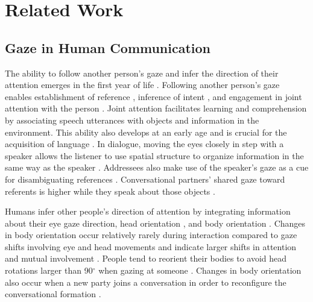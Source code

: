 


\pagestyle{deposit}

\chapter{Related Work}

\section{Gaze in Human Communication}
\label{sec:BackgroundHumanGaze}

The ability to follow another person's gaze and infer the direction of their attention emerges in the first year of life \citep{scaife1975infant}. Following another person's gaze enables establishment of reference \citep{dentremont2007early}, inference of intent \citep{mumme2007actions}, and engagement in joint attention with the person \citep{dentremont2007early}. Joint attention facilitates learning and comprehension by associating speech utterances with objects and information in the environment. This ability also develops at an early age and is crucial for the acquisition of language \citep{woodward2005infants}. In dialogue, moving the eyes closely in step with a speaker allows the listener to use spatial structure to organize information in the same way as the speaker \citep{richardson2005looking}. Addressees also make use of the speaker's gaze as a cue for disambiguating references \citep{hanna2007speakers,preissler2005role}. Conversational partners' shared gaze toward referents is higher while they speak about those objects \citep{bard1988referring}.

Humans infer other people's direction of attention by integrating information about their eye gaze direction, head orientation \citep{hietanen1999does}, and body orientation \citep{langton2000eyes,hietanen2002social,pomianowska2011socialcues}. Changes in body orientation occur relatively rarely during interaction compared to gaze shifts involving eye and head movements and indicate larger shifts in attention and mutual involvement \citep{kendon1973visible,schegloff1998bodytorque}. People tend to reorient their bodies to avoid head rotations larger than 90$^{\circ}$ when gazing at someone \citep{kendon1973visible}. Changes in body orientation also occur when a new party joins a conversation in order to reconfigure the conversational formation \citep{kendon2010spacing}.

